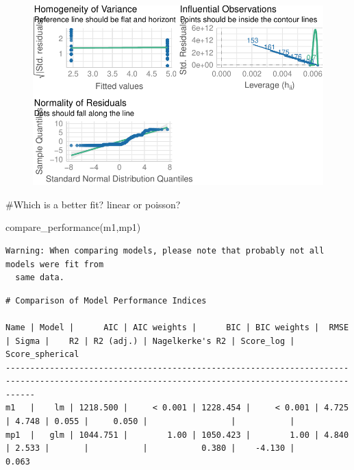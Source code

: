\documentclass[
  letterpaper,
  DIV=11,
  numbers=noendperiod]{scrreprt}
\newenvironment{Shaded}{\begin{snugshade}}{\end{snugshade}}
\newcommand{\CommentTok}[1]{\textcolor[rgb]{0.37,0.37,0.37}{#1}}
\newcommand{\FunctionTok}[1]{\textcolor[rgb]{0.28,0.35,0.67}{#1}}
\newcommand{\NormalTok}[1]{\textcolor[rgb]{0.00,0.23,0.31}{#1}}
\begin{document}
\begin{figure}[H]

{\centering \includegraphics{analysis/SGC3A/4_sgc3A_hypotesting_files/figure-pdf/DIAGNOSTICS-ABSCORE-POISSON-1.pdf}

}

\end{figure}

\begin{Shaded}
\begin{Highlighting}[]
\CommentTok{\#Which is a better fit? linear or poisson?}

\FunctionTok{compare\_performance}\NormalTok{(m1,mp1)}
\end{Highlighting}
\end{Shaded}

\begin{verbatim}
Warning: When comparing models, please note that probably not all models were fit from
  same data.
\end{verbatim}

\begin{verbatim}
# Comparison of Model Performance Indices

Name | Model |      AIC | AIC weights |      BIC | BIC weights |  RMSE | Sigma |    R2 | R2 (adj.) | Nagelkerke's R2 | Score_log | Score_spherical
--------------------------------------------------------------------------------------------------------------------------------------------------
m1   |    lm | 1218.500 |     < 0.001 | 1228.454 |     < 0.001 | 4.725 | 4.748 | 0.055 |     0.050 |                 |           |                
mp1  |   glm | 1044.751 |        1.00 | 1050.423 |        1.00 | 4.840 | 2.533 |       |           |           0.380 |    -4.130 |           0.063
\end{verbatim}
\end{document}
